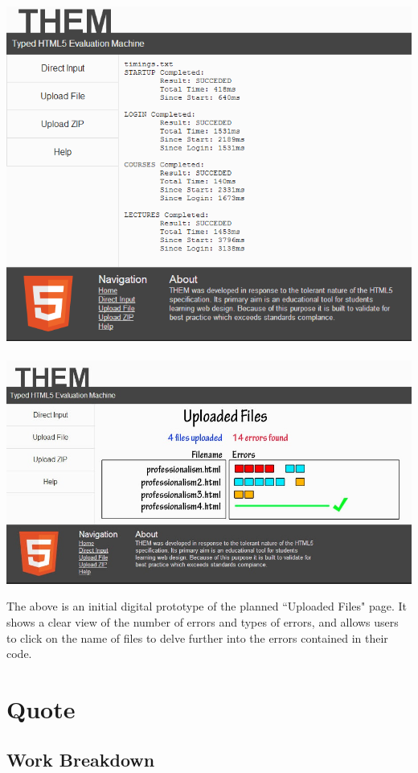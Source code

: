 \documentclass[12pt]{article}
\begin{document}
\includegraphics[scale=0.65]{upload_file_return.png} \\ \\

\includegraphics[scale=0.65]{uploadedfiles.jpg}

The above is an initial digital prototype of the planned ``Uploaded Files" page. It shows a clear view of the number of errors and types of errors, and allows users to click on the name of files to delve further into the errors contained in their code.

\section*{Quote}

\subsection*{Work Breakdown}
\end{document}
